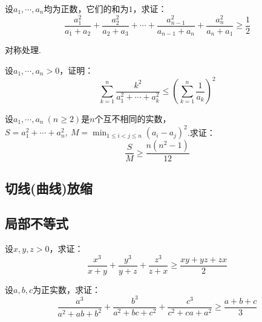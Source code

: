 \documentclass[cn,hazy,black,10pt,normal]{elegantnote}
\newcommand{\ssb}[1]{\left( #1 \right)}
\begin{document}
\begin{problem} %
	设$a_1, \cdots ,a_n$均为正数，它们的和为$1$，求证：$$\frac{a_1^2}{a_1+a_2} + \frac{a_2^2}{a_2+a_3} + \cdots + \frac{a_{n-1}^{2}}{a_{n-1}+a_n} + \frac{a_n^2}{a_n+a_1} \geq \frac{1}{2}$$
\end{problem}
\begin{solution}
	对称处理.%
\end{solution}

\begin{problem} %
	设$a_1, \cdots ,a_n>0$，证明：$$\sum_{k=1}^{n} \frac{k^2}{a_1^2+ \cdots + a_k^2} \leq \ssb{\sum_{k=1}^{n} \frac{1}{a_k}}^2$$
\end{problem}
\begin{solution}
\end{solution}

\begin{problem} %
	设$a_1,\cdots ,a_n~(n \geq 2)$是$n$个互不相同的实数，$S=a_1^2+\cdots +a_n^2,~\displaystyle{ M=\min_{1 \leq i < j \leq n} (a_i-a_j)^2 }$.求证：$$\frac{S}{M} \geq \frac{n(n^2-1)}{12}$$
\end{problem}
\begin{solution}
\end{solution}


\subsection{切线(曲线)放缩}

\subsection{局部不等式}

\begin{problem} %
	设$x,y,z>0$，求证：$$\frac{x^3}{x+y} + \frac{y^3}{y+z} + \frac{z^3}{z+x} \geq \frac{xy+yz+zx}{2}$$
\end{problem}
\begin{solution}
\end{solution}

\begin{problem} %
	设$a,b,c$为正实数，求证：$$\frac{a^3}{a^2+ab+b^2} + \frac{b^3}{a^2+bc+c^2} + \frac{c^3}{c^2+ca+a^2} \geq \frac{a+b+c}{3}$$
\end{problem}
\begin{solution}
\end{solution}
\end{document}
